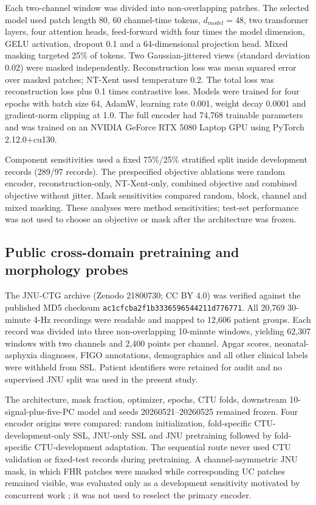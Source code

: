 \documentclass[utf8]{FrontiersinHarvard}
\begin{document}
Each two-channel window was divided into non-overlapping patches. The selected model used patch length 80, 60 channel-time tokens, $d_{model}=48$, two transformer layers, four attention heads, feed-forward width four times the model dimension, GELU activation, dropout 0.1 and a 64-dimensional projection head. Mixed masking targeted 25\% of tokens. Two Gaussian-jittered views (standard deviation 0.02) were masked independently. Reconstruction loss was mean squared error over masked patches; NT-Xent used temperature 0.2. The total loss was reconstruction loss plus 0.1 times contrastive loss. Models were trained for four epochs with batch size 64, AdamW, learning rate 0.001, weight decay 0.0001 and gradient-norm clipping at 1.0. The full encoder had 74,768 trainable parameters and was trained on an NVIDIA GeForce RTX 5080 Laptop GPU using PyTorch 2.12.0+cu130.

Component sensitivities used a fixed 75\%/25\% stratified split inside development records (289/97 records). The prespecified objective ablations were random encoder, reconstruction-only, NT-Xent-only, combined objective and combined objective without jitter. Mask sensitivities compared random, block, channel and mixed masking. These analyses were method sensitivities; test-set performance was not used to choose an objective or mask after the architecture was frozen.

\subsection{Public cross-domain pretraining and morphology probes}

The JNU-CTG archive (Zenodo 21800730; CC BY 4.0) was verified against the published MD5 checksum \texttt{ac1cfcba2f1b3336596544211d776771}. All 20,769 30-minute 4-Hz recordings were readable and mapped to 12,606 patient groups. Each record was divided into three non-overlapping 10-minute windows, yielding 62,307 windows with two channels and 2,400 points per channel. Apgar scores, neonatal-asphyxia diagnoses, FIGO annotations, demographics and all other clinical labels were withheld from SSL. Patient identifiers were retained for audit and no supervised JNU split was used in the present study.

The architecture, mask fraction, optimizer, epochs, CTU folds, downstream 10-signal-plus-five-PC model and seeds 20260521--20260525 remained frozen. Four encoder origins were compared: random initialization, fold-specific CTU-development-only SSL, JNU-only SSL and JNU pretraining followed by fold-specific CTU-development adaptation. The sequential route never used CTU validation or fixed-test records during pretraining. A channel-asymmetric JNU mask, in which FHR patches were masked while corresponding UC patches remained visible, was evaluated only as a development sensitivity motivated by concurrent work \citep{fridman2026ctgfoundation}; it was not used to reselect the primary encoder.
\end{document}
